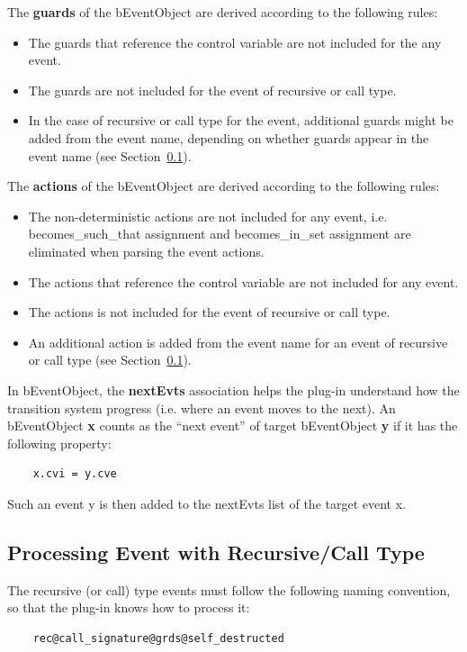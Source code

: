 \documentclass{easychair}
\begin{document}
The \textbf{guards} of the bEventObject are derived according to the following rules:
\begin{itemize}
	\item The guards that reference the control variable are not included for the any event.
	\item The guards are not included for the event of recursive or call type.
	\item In the case of recursive or call type for the event, additional guards might be added from the event name, depending on whether guards appear in the event name (see Section~\ref{subsec:issue}).  
\end{itemize}

The \textbf{actions} of the bEventObject are derived according to the following rules:
\begin{itemize}
	\item The non-deterministic actions are not included for any event, i.e. becomes\_such\_that assignment  and becomes\_in\_set assignment are eliminated when parsing the event actions.
	\item The actions that reference the control variable are not included for any event.
	\item The actions is not included for the event of recursive or call type.
	\item An additional action is added from the event name for an event of recursive or call type (see Section~\ref{subsec:issue}).  
\end{itemize}

In bEventObject, the \textbf{nextEvts} association helps the plug-in understand how the transition system progress (i.e. where an event moves to the next). An bEventObject \textbf{x} counts as the “next event” of target bEventObject \textbf{y} if it has the following property:
\begin{lstlisting}
	x.cvi = y.cve
\end{lstlisting}
Such an event y is then added to the nextEvts list of the target event x.


\subsection{Processing Event with Recursive/Call Type}\label{subsec:issue}
The recursive (or call) type events must follow the following naming convention, so that the plug-in knows how to process it:

\lstset{language=[68]Algol}
\begin{lstlisting}
	rec@call_signature@grds@self_destructed
\end{lstlisting}
\end{document}

